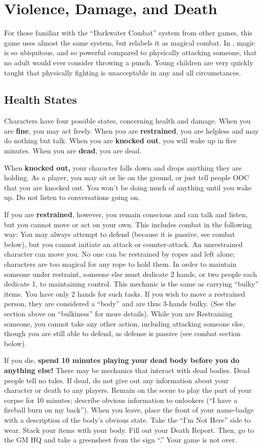 \documentclass[sheet]{GL2020}
\begin{document}
\section{Violence, Damage, and Death}
For those familiar with the ``Darkwater Combat'' system from other games, this game uses almost the same system, but relabels it as magical combat. In \pEarth{}, magic is so ubiquitous, and so powerful compared to physically attacking someone, that no adult would ever consider throwing a punch. Young children are very quickly taught that physically fighting is unacceptable in any and all circumstances.

\subsection{Health States}

Characters have four possible states, concerning health and damage. When you are {\bf fine}, you may act freely. When you are {\bf restrained}, you are helpless and may do nothing but talk. When you are {\bf knocked out}, you will wake up in five minutes. When you are {\bf dead}, you are dead.

When \textbf{knocked out,} your character falls down and drops anything they are holding. As a player, you may sit or lie on the ground, or just tell people OOC that you are knocked out. You won't be doing much of anything until you wake up. Do not listen to conversations going on. 

If you are \textbf{restrained}, however, you remain conscious and can talk and listen, but you cannot move or act on your own. This includes combat in the following way: You may always attempt to defend (because it is passive, see combat below), but you cannot initiate an attack or counter-attack. An unrestrained character can move you. No one can be restrained by ropes and left alone; characters are too magical for any rope to hold them. In order to maintain someone under restraint, someone else must dedicate 2 hands, or two people each dedicate 1, to maintaining control. This mechanic is the same as carrying ``bulky'' items. You have only 2 hands for such tasks. If you wish to move a restrained person, they are considered a ``body'' and are thus 3-hands bulky. (See the section above on ``bulkiness'' for more details). While you are Restraining someone, you cannot take any other action, including attacking someone else, though you are still able to defend, as defense is passive (see combat section below).

If you die, \textbf{spend 10 minutes playing your dead body before you do anything else!} There may be mechanics that interact with dead bodies. Dead people tell no tales. If dead, do not give out any information about your character or death to any players. Remain on the scene to play the part of your corpse for 10 minutes; describe obvious information to onlookers (``I have a fireball burn on my back''). When you leave, place the front of your name-badge with a description of the body's obvious state. Take the ``I'm Not Here'' side to wear. Stack your items with your body. Fill out your Death Report. Then, go to the GM HQ and take a greensheet from the sign ``\sMurdered{}.'' Your game is not over. 
\end{document}

